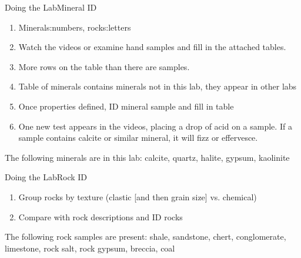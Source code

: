 \documentclass[ignorenonframetext,slidestop]{beamer}
\begin{document}
\begin{frame}{Doing the Lab}{Mineral ID}
  \begin{enumerate}
  \item Minerals:numbers, rocks:letters
  \item Watch the videos or examine hand samples and fill in the attached tables.
  \item More rows on the table than there are samples.
  \item Table of minerals contains minerals not in this lab, they appear in other labs
  \item Once properties defined, ID mineral sample and fill in table
  \item One new test appears in the videos, placing a drop of acid on a sample. If a sample contains calcite or similar mineral, it will fizz or effervesce.
  \end{enumerate}
The following minerals are in this lab:  calcite, quartz, halite, gypsum, kaolinite
\end{frame}

\begin{frame}{Doing the Lab}{Rock ID}
  \begin{enumerate}
  \item Group rocks by texture (clastic [and then grain size] vs. chemical)
  \item Compare with rock descriptions and ID rocks
  \end{enumerate}
The following rock samples are present: shale, sandstone, chert, conglomerate, limestone, rock salt, rock gypsum, breccia, coal
\end{frame}
\end{document}
